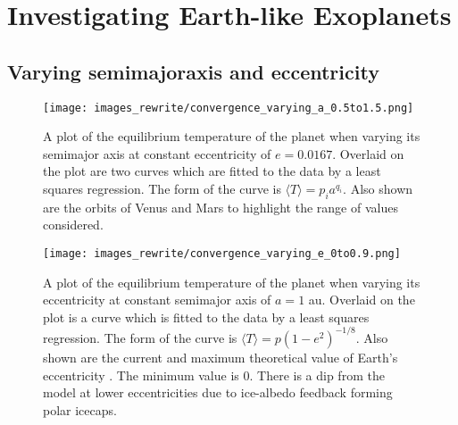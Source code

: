 \documentclass[12pt, onecolumn]{revtex4-2}    %
\begin{document}
\section{Investigating Earth-like Exoplanets} \label{sec:Exoplanets}
%
\subsection{Varying semimajoraxis and eccentricity} \label{ssec:InvTimeAveragedSolarFlux}
%
\begin{figure}[t]
  \texttt{[image: images\_rewrite/convergence\_varying\_a\_0.5to1.5.png]}
  \caption{
    A plot of the equilibrium temperature of the planet when varying its semimajor axis at constant eccentricity of $e=0.0167$.
    Overlaid on the plot are two curves which are fitted to the data by a least squares regression.
    The form of the curve is $\langle T \rangle = p_i a^{q_i}$.
    Also shown are the orbits of Venus and Mars to highlight the range of values considered.
  }
  \label{fig:planet_semimajoraxis}
\end{figure}

\begin{figure}[t]
  \texttt{[image: images\_rewrite/convergence\_varying\_e\_0to0.9.png]}
  \caption{
    A plot of the equilibrium temperature of the planet when varying its eccentricity at constant semimajor axis of $a = 1$ au.
    Overlaid on the plot is a curve which is fitted to the data by a least squares regression.
    The form of the curve is $\langle T \rangle = p(1-e^2)^{-1/8}$.
    Also shown are the current and maximum theoretical value of Earth's eccentricity \cite{LA2010}.
    The minimum value is $0$.
    There is a dip from the model at lower eccentricities due to ice-albedo feedback forming polar icecaps.
  }
  \label{fig:planet_eccentricity}
\end{figure}
\end{document}

